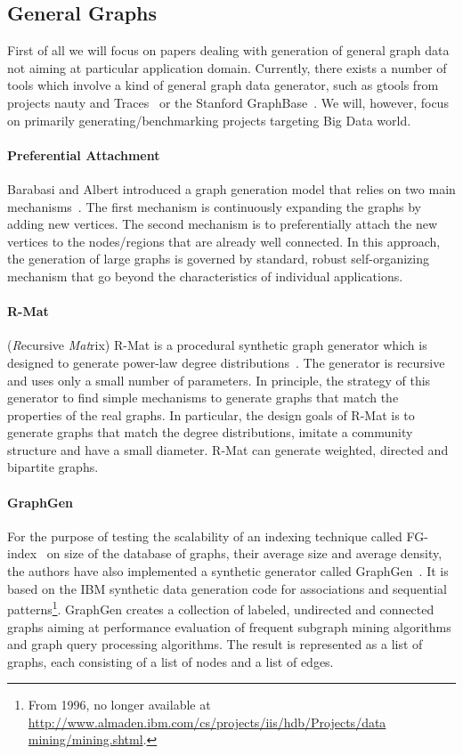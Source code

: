 \subsection{General Graphs}
\label{sec:generators_general}

First of all we will focus on papers dealing with generation of general graph
data not aiming at particular application domain. Currently, there exists a
number of tools which involve a kind of general graph data generator, such as
gtools from projects nauty and Traces~\cite{gtools} or the Stanford
GraphBase~\cite{GraphBase}. We will, however, focus on primarily
generating/benchmarking projects targeting Big Data world.


\paragraph {Preferential Attachment} Barabasi and Albert introduced a graph generation model that relies on two main mechanisms~\cite{Barabasi99emergenceScaling}. The first mechanism is continuously expanding the graphs by adding new vertices. The second mechanism is to preferentially attach the new vertices   to the nodes/regions that are already well connected. In this approach, the generation of large graphs is governed by standard, robust self-organizing mechanism that go beyond the characteristics of individual applications.

\paragraph {R-Mat} (\emph{R}ecursive \emph{Mat}rix) R-Mat is a procedural synthetic graph generator which is designed to generate power-law degree
distributions~\cite{DBLP:conf/sdm/ChakrabartiZF04}. 
The generator is recursive and uses only a small number of parameters.
In principle, the strategy of this generator to find simple mechanisms to generate graphs that match
the properties of the real graphs. In particular, the design goals of R-Mat is to generate graphs that match the degree distributions, imitate a community structure and have a small diameter. R-Mat can generate weighted, directed and bipartite graphs.

\paragraph{GraphGen} For the purpose of testing the scalability of an indexing
technique called FG-index~\cite{Cheng:2007:FTV:1247480.1247574} on size of the
database of graphs, their average size and average density, the authors have
also implemented a synthetic generator called GraphGen~\cite{GraphGen}. It is
based on the IBM synthetic data generation code for associations and sequential
patterns\footnote{From 1996, no longer available at
\url{http://www.almaden.ibm.com/cs/projects/iis/hdb/Projects/data
mining/mining.shtml}.}. GraphGen creates a collection of labeled, undirected and
connected graphs aiming at performance evaluation of frequent subgraph mining
algorithms and graph query processing algorithms. The result is represented as a
list of graphs, each consisting of a list of nodes and a list of edges.




